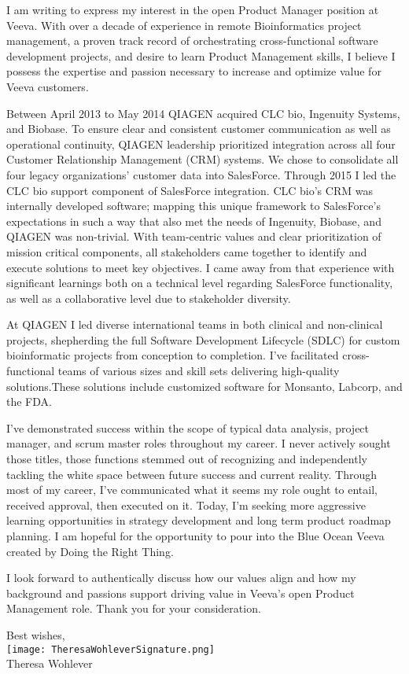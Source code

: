 \documentclass[10pt,letterpaper]{article}
\begin{document}
\begin{flushleft}

	I am writing to express my interest in the open Product Manager position at Veeva. With over a decade of experience in remote Bioinformatics project management, a proven track record of orchestrating cross-functional software development projects, and desire to learn Product Management skills, I believe I possess the expertise and passion necessary to increase and optimize value for Veeva customers.

	Between April 2013 to May 2014 QIAGEN acquired CLC bio, Ingenuity Systems, and Biobase. To ensure clear and consistent customer communication as well as operational continuity, QIAGEN leadership prioritized integration across all four Customer Relationship Management (CRM) systems. We chose to consolidate all four legacy organizations' customer data into SalesForce. Through 2015 I led the CLC bio support component of SalesForce integration. CLC bio’s CRM was internally developed software; mapping this unique framework to SalesForce’s expectations in such a way that also met the needs of Ingenuity, Biobase, and QIAGEN was non-trivial. With team-centric values and clear prioritization of mission critical components, all stakeholders came together to identify and execute solutions to meet key objectives. I came away from that experience with significant learnings both on a technical level regarding SalesForce functionality, as well as a collaborative level due to stakeholder diversity.
	
	At QIAGEN I led diverse international teams in both clinical and non-clinical projects, shepherding the full Software Development Lifecycle (SDLC) for custom bioinformatic projects from conception to completion. I’ve facilitated cross-functional teams of various sizes and skill sets delivering high-quality solutions.These solutions include customized software for Monsanto, Labcorp, and the FDA.
	
	I’ve demonstrated success within the scope of typical data analysis, project manager, and scrum master roles throughout my career. I never actively sought those titles, those functions stemmed out of recognizing and independently tackling the white space between future success and current reality. Through most of my career, I’ve communicated what it seems my role ought to entail, received approval, then executed on it. Today, I’m seeking more aggressive learning opportunities in strategy development and long term product roadmap planning. I am hopeful for the opportunity to pour into the Blue Ocean Veeva created by Doing the Right Thing.
	
	I look forward to authentically discuss how our values align and how my background and passions support driving value in Veeva’s open Product Management role. Thank you for your consideration.
	

\end{flushleft}


\hspace*{.6\linewidth} Best wishes, \\
\hspace*{.57\linewidth} \texttt{[image: TheresaWohleverSignature.png]}  {\vspace{-9pt}} \\
\hspace*{.6\linewidth}  Theresa Wohlever
\end{document}
